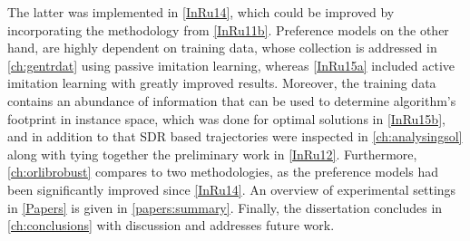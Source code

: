 The latter was implemented in \cref{InRu14}, which could be improved by 
incorporating the methodology from \cref{InRu11b}.
Preference models on  the other hand, are highly dependent on training data, 
whose collection is addressed in \cref{ch:gentrdat} using passive imitation 
learning, whereas \cref{InRu15a} included active imitation learning with 
greatly improved results. 
Moreover, the training data contains an abundance of information that can be 
used to determine algorithm's footprint in instance space, which was done for 
optimal solutions in \cref{InRu15b}, and in addition to that SDR based 
trajectories were inspected in \cref{ch:analysingsol} along with tying together 
the preliminary work in \cref{InRu12}. 
Furthermore, \cref{ch:orlibrobust} compares to two methodologies, as the 
preference models had been significantly improved since \cref{InRu14}.
An overview of experimental settings in \cref{Papers} is given in 
\cref{papers:summary}. Finally, the dissertation concludes in 
\cref{ch:conclusions} with discussion and addresses future work.
    

